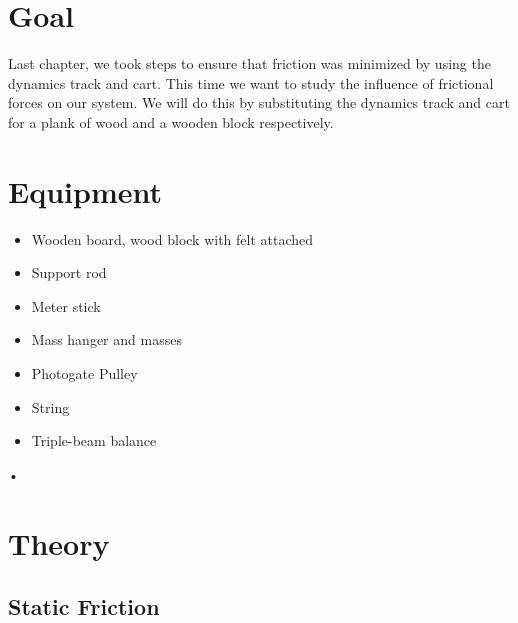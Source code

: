 \documentclass[main.tex]{subfiles}
\begin{document}
\section*{Goal}
Last chapter, we took steps to ensure that friction was minimized by using the dynamics track and cart. This time we want to study the influence of frictional forces on our system. We will do this by substituting the dynamics track and cart for a plank of wood and a wooden block respectively.

\section*{Equipment}
\begin{itemize}
\item
Wooden board, wood block with felt attached
\item
Support rod
\item
Meter stick
\item
Mass hanger and masses
\item
Photogate Pulley
\item
String
\item
Triple-beam balance
\end{itemize}•

\section*{Theory}


\subsection*{Static Friction}

\begin{figure}
\centering
{}
\caption{}\label{fig:FrictGraph}
\end{figure}
\end{document}
